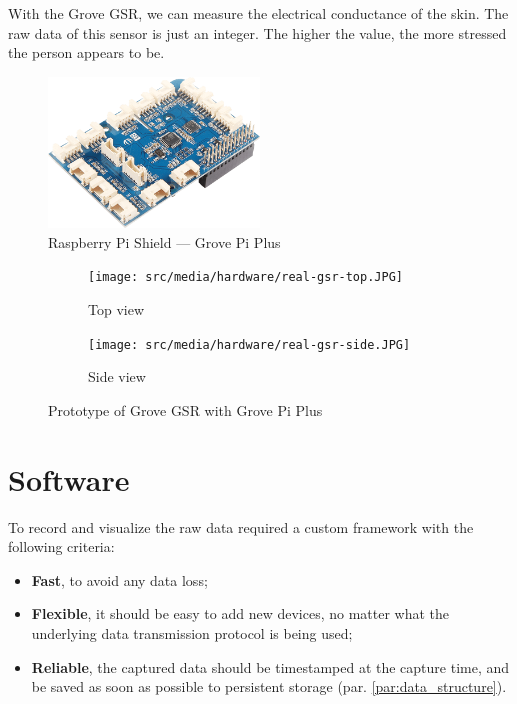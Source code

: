 With the Grove GSR, we can measure the electrical conductance of the skin. The raw data of this sensor is just an integer. The higher the value, the more stressed the person appears to be.


\begin{figure}[h!]
\centering
\includegraphics[width=0.5\textwidth]{src/media/hardware/grove-pi-plus.png}
\caption{Raspberry Pi Shield --- Grove Pi Plus}
\label{image:grovepi}
\end{figure}

\begin{figure}[h!]
\centering
 \begin{subfigure}[b]{0.49\textwidth}
    \texttt{[image: src/media/hardware/real-gsr-top.JPG]}
    \caption{Top view}
    \label{image:real-gsr-top}
  \end{subfigure}
 \hfill
 \begin{subfigure}[b]{0.49\textwidth}
    \texttt{[image: src/media/hardware/real-gsr-side.JPG]}
    \caption{Side view}
    \label{image:real-gsr-side}
  \end{subfigure}
\caption{Prototype of Grove GSR with Grove Pi Plus}
\label{image:real-gsr}
\end{figure}




\section{Software}
\label{sec:software}

To record and visualize the raw data required a custom framework with the following criteria:
\begin{itemize}
    \item \textbf{Fast}, to avoid any data loss;
    \item \textbf{Flexible}, it should be easy to add new devices, no matter what the underlying data transmission protocol is being used;
    \item \textbf{Reliable}, the captured data should be timestamped at the capture time, and be saved as soon as possible to persistent storage (par. \ref{par:data_structure}).
\end{itemize}

